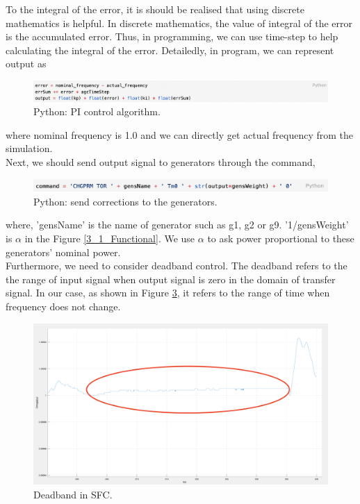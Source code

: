 \documentclass{report}
\begin{document}
To the integral of the error,  it is should be realised that using discrete mathematics is helpful. In discrete mathematics, the value of integral of the error is the accumulated error. Thus, in programming, we can use time-step to help calculating the integral of the error.  Detailedly, in program, we can represent output as\\

\begin{figure}[htbp]
\centering
\includegraphics[width = .999\textwidth]{figure/3_3_code1.png}
\caption{Python: PI control algorithm.}
\label{3_3_code1}
\end{figure}

where nominal frequency is 1.0 and we can directly get actual frequency from the simulation.\\

Next, we should send output signal to generators through the command,\\

\begin{figure}[htbp]
\centering
\includegraphics[width = .999\textwidth]{figure/3_3_code2.png}
\caption{Python: send corrections to the generators.}
\label{3_3_code2}
\end{figure}

where, 'gensName' is the name of generator such as g1, g2 or g9. '1/gensWeight' is $\alpha$ in the Figure \textcolor{red}{\ref{3_1_Functional}}. We use $\alpha$ to ask power proportional to these generators' nominal power. \\

Furthermore, we need to consider deadband control. The deadband refers to the the range of input signal when output signal is zero in the domain of transfer signal. In our case, as shown in Figure \textcolor{red}{\ref{3_3_deadband}}, it refers to the range of time when frequency does not change. \\

\begin{figure}[htbp]
\centering
\includegraphics[width = .999\textwidth]{figure/3_3_deadband.png}
\caption{Deadband in SFC.}
\label{3_3_deadband}
\end{figure}
\end{document}
